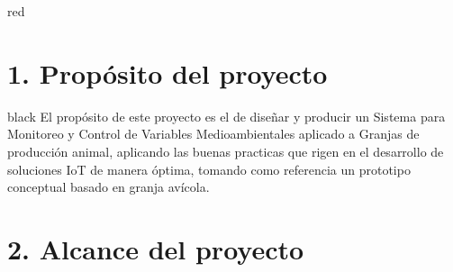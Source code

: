 \documentclass[11pt]{charter}
\begin{document}
\begin{consigna}{red}
\end{consigna}

\section{1. Propósito del proyecto}
\label{sec:proposito}
\begin{consigna}{black} 
El propósito de este proyecto es el de diseñar y producir un Sistema para Monitoreo y Control de Variables Medioambientales aplicado a Granjas de producción animal, aplicando las buenas practicas que rigen en el desarrollo de soluciones IoT de manera óptima, tomando como referencia un prototipo conceptual basado en granja avícola.
\end{consigna}

\section{2. Alcance del proyecto}
\label{sec:alcance}
\end{document}
